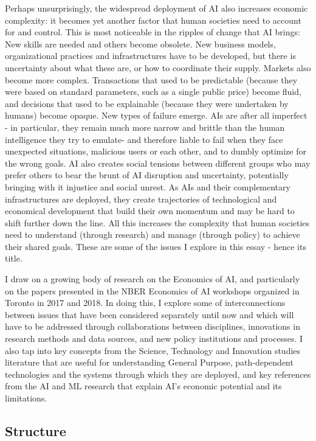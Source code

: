\documentclass[11pt]{article}
\begin{document}
Perhaps unsurprisingly, the widespread deployment of AI also increases economic complexity: it becomes yet another factor that human societies need to account for and control. This is most noticeable in the ripples of change that AI brings: New skills are needed and others become obsolete. New business models, organizational practices and infrastructures have to be developed, but there is uncertainty about what these are, or how to coordinate their supply. Markets also become more complex. Transactions that used to be predictable (because they were based on standard parameters, such as a single public price) become fluid, and decisions that used to be explainable (because they were undertaken by humans) become opaque. New types of failure emerge.  AIs are after all imperfect - in particular, they remain much more narrow and brittle than the human intelligence they try to emulate- and therefore liable to fail when they face unexpected situations, malicious users or each other, and to dumbly optimize for the wrong goals. AI also creates social tensions between different groups who may prefer others to bear the brunt of AI disruption and uncertainty, potentially bringing with it injustice and social unrest. As AIs and their complementary infrastructures are deployed, they create trajectories of technological and economical development that build their own momentum and may be hard to shift further down the line. All this increases the complexity that human societies need to understand (through research) and manage (through policy) to achieve their shared goals. These are some of the issues I explore in this essay - hence its title.  

I draw on a growing body of research on the Economics of AI, and particularly on the papers presented in the NBER Economics of AI workshops organized in Toronto in 2017 and 2018. In doing this, I explore some of interconnections between issues that have been considered separately until now and which will have to be addressed through collaborations between disciplines, innovations in research methods and data sources, and new policy institutions and processes. I also tap into key concepts from the Science, Technology and Innovation studies literature that are useful for understanding General Purpose, path-dependent technologies and the systems through which they are deployed, and key references from the AI and ML research that explain AI's economic potential and its limitations. 

\subsection{Structure}
\label{subsec:structure}
\end{document}

